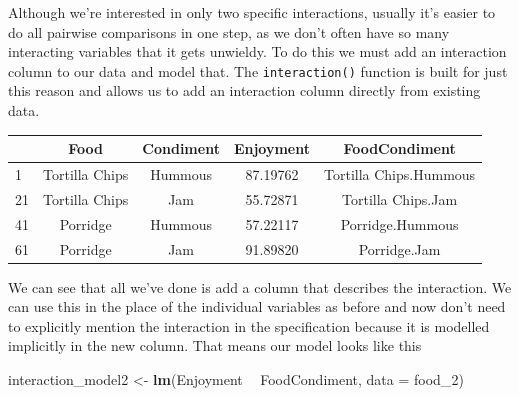 \documentclass[
]{book}
\newenvironment{Shaded}{\begin{snugshade}}{\end{snugshade}}
\newcommand{\DataTypeTok}[1]{\textcolor[rgb]{0.13,0.29,0.53}{#1}}
\newcommand{\DecValTok}[1]{\textcolor[rgb]{0.00,0.00,0.81}{#1}}
\newcommand{\KeywordTok}[1]{\textcolor[rgb]{0.13,0.29,0.53}{\textbf{#1}}}
\newcommand{\NormalTok}[1]{#1}
\newcommand{\OperatorTok}[1]{\textcolor[rgb]{0.81,0.36,0.00}{\textbf{#1}}}
\newcommand{\StringTok}[1]{\textcolor[rgb]{0.31,0.60,0.02}{#1}}
\begin{document}
Although we're interested in only two specific interactions, usually it's easier to do all pairwise comparisons in one step, as we don't often have so many interacting variables that it gets unwieldy. To do this we must add an interaction column to our data and model that. The \texttt{interaction()} function is built for just this reason and allows us to add an interaction column directly from existing data.

\begin{Shaded}
\end{Shaded}

\begin{tabular}{l|c|c|c|c}
\hline
  & Food & Condiment & Enjoyment & FoodCondiment\\
\hline
1 & Tortilla Chips & Hummous & 87.19762 & Tortilla Chips.Hummous\\
\hline
21 & Tortilla Chips & Jam & 55.72871 & Tortilla Chips.Jam\\
\hline
41 & Porridge & Hummous & 57.22117 & Porridge.Hummous\\
\hline
61 & Porridge & Jam & 91.89820 & Porridge.Jam\\
\hline
\end{tabular}

We can see that all we've done is add a column that describes the interaction. We can use this in the place of the individual variables as before and now don't need to explicitly mention the interaction in the specification because it is modelled implicitly in the new column. That means our model looks like this

\begin{Shaded}
\begin{Highlighting}[]
\NormalTok{interaction_model2 <-}\StringTok{ }\KeywordTok{lm}\NormalTok{(Enjoyment }\OperatorTok{~}\StringTok{ }\NormalTok{FoodCondiment, }\DataTypeTok{data =}\NormalTok{ food_}\DecValTok{2}\NormalTok{)}
\end{Highlighting}
\end{Shaded}
\end{document}
